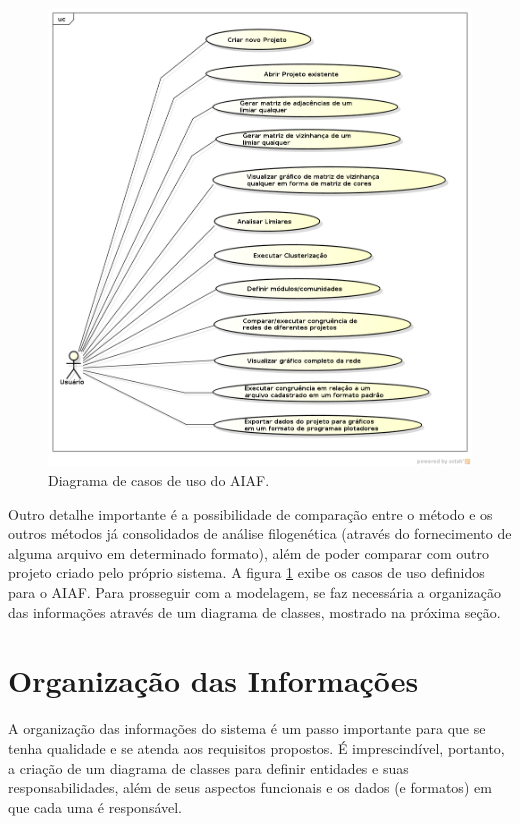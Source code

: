 \begin{figure}
\centering
\includegraphics[scale=0.52]{diagrama-casos-de-uso}
\caption{Diagrama de casos de uso do AIAF.}
\label{fig:casos-uso}
\end{figure}

Outro detalhe importante é a possibilidade de comparação entre o método e os outros métodos já consolidados de análise filogenética (através do fornecimento
de alguma arquivo em determinado formato), além de poder comparar com outro projeto criado pelo próprio sistema. A figura \ref{fig:casos-uso} exibe os casos
de uso definidos para o AIAF. Para prosseguir com a modelagem, se faz necessária a organização das informações através de um diagrama de classes,
mostrado na próxima seção.

\section{Organização das Informações} \label{sec:organizacao}

A organização das informações do sistema é um passo importante para que se tenha qualidade e se atenda aos requisitos propostos. É imprescindível, portanto,
a criação de um diagrama de classes para definir entidades e suas responsabilidades, além de seus aspectos funcionais e os dados (e formatos) em que cada uma
é responsável.

